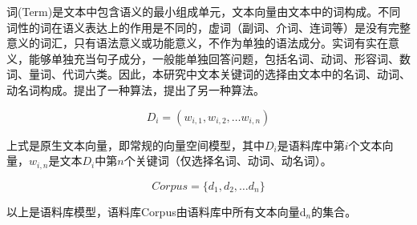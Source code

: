 
词(Term)是文本中包含语义的最小组成单元，文本向量由文本中的词构成。不同词性的词在语义表达上的作用是不同的，虚词（副词、介词、连词等）是没有完整意义的词汇，只有语法意义或功能意义，不作为单独的语法成分。实词有实在意义，能够单独充当句子成分，一般能单独回答问题，包括名词、动词、形容词、数词、量词、代词六类。因此，本研究中文本关键词的选择由文本中的名词、动词、动名词构成。\citet{kottwitz2011latex}提出了一种算法，\citet{NI-OVERSAMPLING}提出了另一种算法。

\begin{equation}
D_i = ( w_{i,1}, w_{i,2}, \ldots w_{i,n} )
\end{equation}

上式是原生文本向量，即常规的向量空间模型，其中$D_i$是语料库中第$i$个文本向量，$w_{i,n}$是文本$D_i$中第$n$个关键词（仅选择名词、动词、动名词）。

\begin{equation}
Corpus = \{ d_1, d_2, \ldots d_n \}
\end{equation}

以上是语料库模型，语料库Corpus由语料库中所有文本向量d$_n$的集合。
